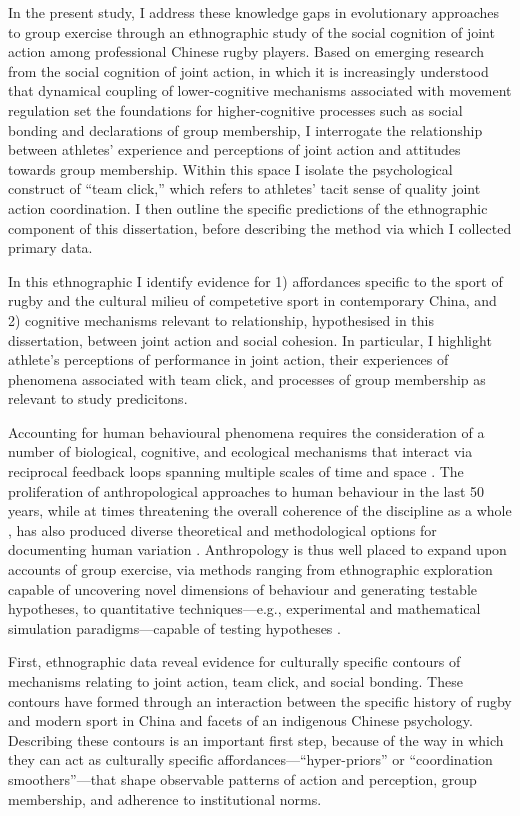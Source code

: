 In the present study, I address these knowledge gaps in evolutionary approaches to group exercise through an ethnographic study of the social cognition of joint action among professional Chinese rugby players.  Based on emerging research from the social cognition of joint action, in which it is increasingly understood that dynamical coupling of lower-cognitive mechanisms associated with movement regulation set the foundations for higher-cognitive processes such as social bonding and declarations of group membership, I interrogate the relationship between athletes' experience and perceptions of joint action and attitudes towards group membership.  Within this space I isolate the psychological construct of ``team click,'' which refers to athletes' tacit sense of quality joint action coordination.   I then outline the specific predictions of the ethnographic component of this dissertation, before describing the method via which I collected primary data.


In this ethnographic I identify evidence for 1) affordances specific to the sport of rugby and the cultural milieu of competetive sport in contemporary China, and 2) cognitive mechanisms relevant to relationship, hypothesised in this dissertation, between joint action and social cohesion.  In particular, I highlight athlete's perceptions of performance in joint action, their experiences of phenomena associated with team click, and processes of group membership as relevant to study predicitons.

Accounting for human behavioural phenomena requires the consideration of a number of biological, cognitive, and ecological mechanisms that interact via reciprocal feedback loops spanning multiple scales of time and space \citep{Fuentes2015}.
The proliferation of anthropological approaches to human behaviour in the last 50 years, while at times threatening the overall coherence of the discipline as a whole \citep{Beller2012}, has also produced diverse theoretical and methodological options for documenting human variation \citep{Fuentes2016a}.
Anthropology is thus well placed to expand upon accounts of group exercise, via methods ranging from ethnographic exploration capable of uncovering novel dimensions of behaviour and generating testable hypotheses, to quantitative techniques---e.g., experimental and mathematical simulation paradigms---capable of testing hypotheses \citep{Epstein2006,Fuentes2016}.



First, ethnographic data reveal evidence for culturally specific contours of mechanisms relating to joint action, team click, and social bonding.  These contours have formed through an interaction between the specific history of rugby and modern sport in China and facets of an indigenous Chinese psychology.  Describing these contours is an important first step, because of the way in which they can act as culturally specific affordances---``hyper-priors'' or ``coordination smoothers''---that shape observable patterns of action and perception, group membership, and adherence to institutional norms.

